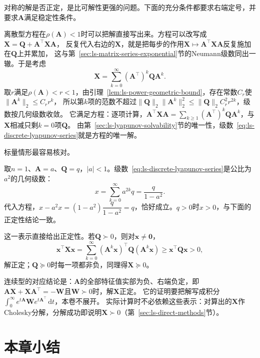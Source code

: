 对称的解是否正定，是比可解性更强的问题。下面的充分条件都要求右端定号，并要求$\bm A$满足稳定性条件。

离散型方程在$\rho(\bm A)<1$时可以把解直接写出来。方程可以改写成$\bm X=\bm Q+\bm A^\top\bm X\bm A$，
反复代入右边的$\bm X$，就是把每步的作用$\bm X\mapsto\bm A^\top\bm X\bm A$反复施加在$\bm Q$上并累加，
这与第~\ref{sec:ls-matrix-series-exponential}节的Neumann级数同出一辙。于是考虑
\begin{equation}
 \bm X=\sum_{k=0}^{\infty}(\bm A^{\top})^k\bm Q\bm A^k .
 \label{eq:ls-discrete-lyapunov-series}
\end{equation}
取$r$满足$\rho(\bm A)<r<1$，由引理~\ref{lem:ls-power-geometric-bound}，存在常数$C_r$使$\lVert\bm A^k\rVert_2\leq C_rr^k$，
所以第$k$项的范数不超过$\lVert\bm Q\rVert_2\lVert\bm A^k\rVert_2^2\leq\lVert\bm Q\rVert_2C_r^2r^{2k}$，级数按几何级数收敛。
它满足方程：逐项计算，$\bm A^\top\bm X\bm A=\sum_{k\geq1}(\bm A^\top)^k\bm Q\bm A^k$，与$\bm X$相减只剩$k=0$项$\bm Q$。
由第~\ref{sec:ls-lyapunov-solvability}节的唯一性，级数~\eqref{eq:ls-discrete-lyapunov-series}就是方程的唯一解。

标量情形最容易核对。

\begin{example}[标量离散Lyapunov方程]
\label{ex:ls-scalar-discrete-lyapunov}
取$n=1$、$\bm A=a$、$\bm Q=q$，$|a|<1$。级数~\eqref{eq:ls-discrete-lyapunov-series}是公比为$a^2$的几何级数：
\[
 x=\sum_{k=0}^{\infty}a^{2k}q=\frac{q}{1-a^2}.
\]
代入方程，$x-a^2x=(1-a^2)\dfrac{q}{1-a^2}=q$，恰好成立。$q>0$时$x>0$，与下面的正定性结论一致。
\end{example}

这一表示直接给出正定性。若$\bm Q\succ0$，则对$\bm x\neq\bm0$，
\[
 \bm x^\top\bm X\bm x=\sum_{k=0}^{\infty}(\bm A^k\bm x)^\top\bm Q(\bm A^k\bm x)\geq\bm x^\top\bm Q\bm x>0 ,
\]
解正定；$\bm Q\succeq0$时每一项都非负，同理得$\bm X\succeq0$。

连续型的对应结论是：$\bm A$的全部特征值实部为负、右端负定，即$\bm A\bm X+\bm X\bm A^\top=-\bm W$且$\bm W\succ0$时，解$\bm X$正定。
它的证明要把解写成积分$\int_0^\infty e^{t\bm A}\bm W e^{t\bm A^\top}\,\mathrm dt$，本卷不展开。
实际计算时不必依赖这些表示：对算出的$\bm X$作Cholesky分解，分解成功即说明$\bm X\succ0$（第~\ref{sec:ls-direct-methods}节）。

\section{本章小结}
\label{sec:ls-equations-summary}

